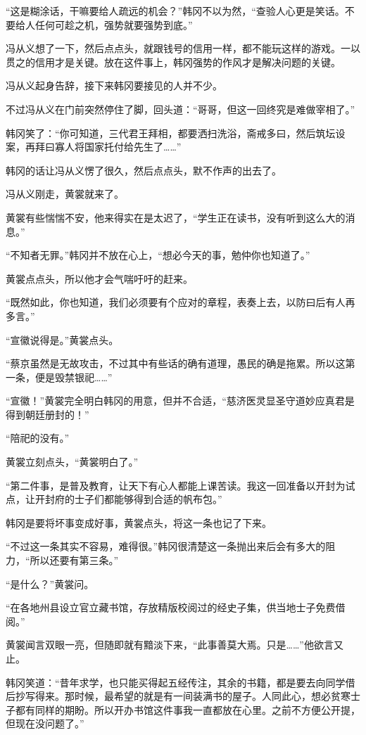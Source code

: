 “这是糊涂话，干嘛要给人疏远的机会？”韩冈不以为然，“查验人心更是笑话。不要给人任何可趁之机，强势就要强势到底。”

冯从义想了一下，然后点点头，就跟钱号的信用一样，都不能玩这样的游戏。一以贯之的信用才是关键。放在这件事上，韩冈强势的作风才是解决问题的关键。

冯从义起身告辞，接下来韩冈要接见的人并不少。

不过冯从义在门前突然停住了脚，回头道：“哥哥，但这一回终究是难做宰相了。”

韩冈笑了：“你可知道，三代君王拜相，都要洒扫洗浴，斋戒多曰，然后筑坛设案，再拜曰寡人将国家托付给先生了……”

韩冈的话让冯从义愣了很久，然后点点头，默不作声的出去了。

冯从义刚走，黄裳就来了。

黄裳有些惴惴不安，他来得实在是太迟了，“学生正在读书，没有听到这么大的消息。”

“不知者无罪。”韩冈并不放在心上，“想必今天的事，勉仲你也知道了。”

黄裳点点头，所以他才会气喘吁吁的赶来。

“既然如此，你也知道，我们必须要有个应对的章程，表奏上去，以防曰后有人再多言。”

“宣徽说得是。”黄裳点头。

“蔡京虽然是无故攻击，不过其中有些话的确有道理，愚民的确是拖累。所以这第一条，便是毁禁银祀……”

“宣徽！”黄裳完全明白韩冈的用意，但并不合适，“慈济医灵显圣守道妙应真君是得到朝廷册封的！”

“陪祀的没有。”

黄裳立刻点头，“黄裳明白了。”

“第二件事，是普及教育，让天下有心人都能上课苦读。我这一回准备以开封为试点，让开封府的士子们都能够得到合适的帆布包。”

韩冈是要将坏事变成好事，黄裳点头，将这一条也记了下来。

“不过这一条其实不容易，难得很。”韩冈很清楚这一条抛出来后会有多大的阻力，“所以还要有第三条。”

“是什么？”黄裳问。

“在各地州县设立官立藏书馆，存放精版校阅过的经史子集，供当地士子免费借阅。”

黄裳闻言双眼一亮，但随即就有黯淡下来，“此事善莫大焉。只是……”他欲言又止。

韩冈笑道：“昔年求学，也只能买得起五经传注，其余的书籍，都是要去向同学借后抄写得来。那时候，最希望的就是有一间装满书的屋子。人同此心，想必贫寒士子都有同样的期盼。所以开办书馆这件事我一直都放在心里。之前不方便公开提，但现在没问题了。”

